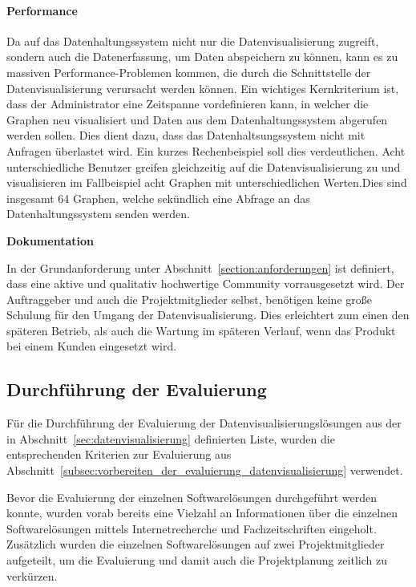 \paragraph{Performance}
\begin{outline}
  \1 Da auf das Datenhaltungssystem nicht nur die Datenvisualisierung zugreift,
  sondern auch die Datenerfassung, um Daten abspeichern zu können, kann es zu
  massiven Performance\hyp{}Problemen kommen, die durch die Schnittstelle der
  Datenvisualisierung verursacht werden können. Ein wichtiges Kernkriterium
  ist, dass der Administrator eine Zeitspanne vordefinieren kann, in welcher
  die Graphen neu visualisiert und Daten aus dem Datenhaltungssystem abgerufen
  werden sollen. Dies dient dazu, dass das Datenhaltsungssystem nicht mit
  Anfragen überlastet wird. Ein kurzes Rechenbeispiel soll dies verdeutlichen.
  Acht unterschiedliche Benutzer greifen gleichzeitig auf die
  Datenvisualisierung zu und visualisieren im Fallbeispiel acht Graphen mit
  unterschiedlichen Werten.Dies sind insgesamt 64 Graphen, welche sekündlich
  eine Abfrage an das Datenhaltungssystem senden werden.
\end{outline}

\textbf{Dokumentation}
\begin{outline}
  \1  In der Grundanforderung unter Abschnitt~\ref{section:anforderungen} ist
  definiert, dass eine aktive und qualitativ hochwertige Community
  vorrausgesetzt wird. Der Auftraggeber und auch die Projektmitglieder selbst,
  benötigen keine große Schulung für den Umgang der Datenvisualisierung. Dies
  erleichtert zum einen den späteren Betrieb, als auch die Wartung im späteren
  Verlauf, wenn das Produkt bei einem Kunden eingesetzt wird.
\end{outline}
\mr%

\subsection{Durchführung der Evaluierung}
\label{subsec:durchfuehrung_evaluierung_datenvisualisierung}
Für die Durchführung der Evaluierung der Datenvisualisierungslösungen aus der
in Abschnitt~\ref{sec:datenvisualisierung} definierten Liste, wurden die
entsprechenden Kriterien zur Evaluierung aus
Abschnitt~\ref{subsec:vorbereiten_der_evaluierung_datenvisualisierung}
verwendet.

Bevor die Evaluierung der einzelnen Softwarelösungen durchgeführt werden
konnte, wurden vorab bereits eine Vielzahl an Informationen über die einzelnen
Softwarelösungen mittels Internetrecherche und Fachzeitschriften eingeholt.
Zusätzlich wurden die einzelnen Softwarelösungen auf zwei Projektmitglieder
aufgeteilt, um die Evaluierung und damit auch die Projektplanung zeitlich zu
verkürzen.

